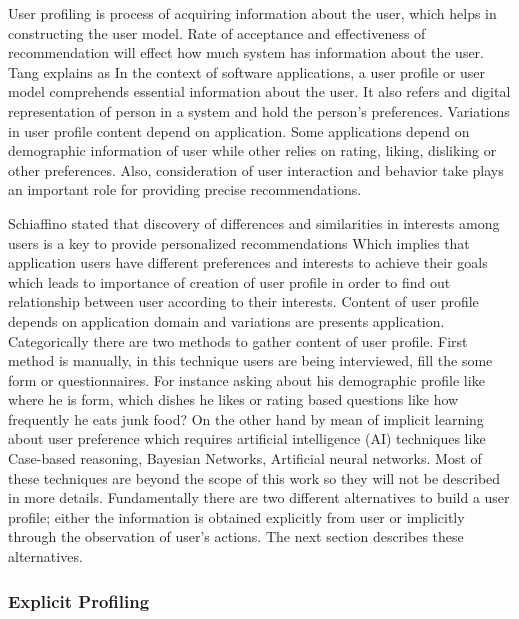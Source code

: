 User profiling is process of acquiring information about the user, which helps in constructing the user model. Rate of acceptance and effectiveness of recommendation will effect how much system has information about the user. Tang \cite[Tang, 2010]{tang2010combination} explains as  In the context of software applications, a user profile or user model comprehends essential information about the user. It also refers and digital representation of person in a system and hold the person’s preferences. Variations in user profile content depend on application. Some applications depend on demographic information of user while other relies on rating, liking, disliking or other preferences. Also, consideration of user interaction and behavior take plays an important role for providing precise recommendations.\newline

Schiaffino \cite[Schiaffino, 2009]{schiaffino2009intelligent} stated that discovery of differences and similarities in interests among users is a key to provide personalized recommendations  Which implies that application users have different preferences and interests to achieve their goals which leads to importance of creation of user profile in order to find out relationship between user according to their interests. Content of user profile depends on application domain and variations are presents application. Categorically there are two methods to gather content of user profile. First method is manually, in this technique users are being interviewed, fill the some form or questionnaires. For instance asking about his demographic profile like where he is form, which dishes he likes or rating based questions like how frequently he eats junk food? On the other hand by mean of implicit learning about user preference which requires artificial intelligence (AI) techniques like Case-based reasoning, Bayesian Networks, Artificial neural networks. Most of these techniques are beyond the scope of this work so they will not be described in more details. Fundamentally there are two different alternatives to build a user profile; either the information is obtained explicitly from user or implicitly through the observation of user’s actions. The next section describes these alternatives.\newline

\subsubsection{Explicit Profiling}

